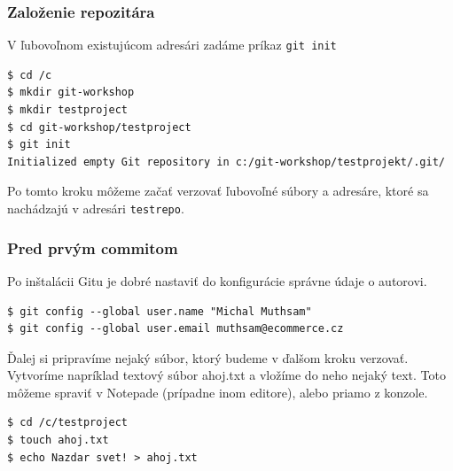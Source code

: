 \documentclass[red]{beamer}
\begin{document}
\begin{frame}[fragile]
\frametitle{Založenie repozitára}   
V ľubovoľnom existujúcom adresári zadáme príkaz \texttt{git init}

\begin{block}{}
\begin{verbatim}
$ cd /c
$ mkdir git-workshop
$ mkdir testproject
$ cd git-workshop/testproject
$ git init
Initialized empty Git repository in c:/git-workshop/testprojekt/.git/	
\end{verbatim}
\end{block}

Po tomto kroku môžeme začať verzovať ľubovoľné súbory a adresáre, ktoré sa nachádzajú v adresári \texttt{testrepo}.
\end{frame}

\begin{frame}[fragile]
\frametitle{Pred prvým commitom}   

Po inštalácii Gitu je dobré nastaviť do konfigurácie správne údaje o autorovi.

\begin{block}{}
\begin{verbatim}
$ git config --global user.name "Michal Muthsam"
$ git config --global user.email muthsam@ecommerce.cz
\end{verbatim}
\end{block}
Ďalej si pripravíme nejaký súbor, ktorý budeme v ďalšom kroku verzovať. Vytvoríme napríklad textový súbor ahoj.txt a vložíme do neho nejaký text. Toto môžeme spraviť v Notepade (prípadne inom editore), alebo priamo z konzole.
\begin{block}{}
\begin{verbatim}
$ cd /c/testproject
$ touch ahoj.txt
$ echo Nazdar svet! > ahoj.txt
\end{verbatim}
\end{block}
\end{frame}
\end{document}
